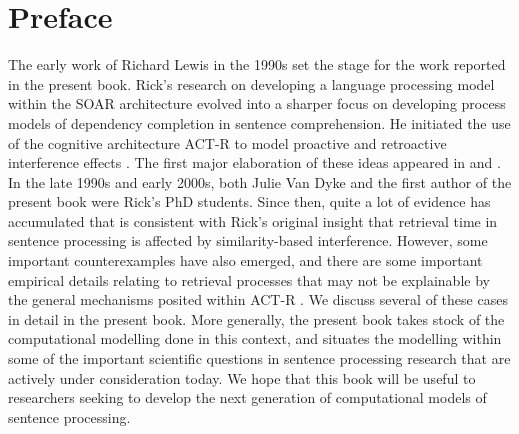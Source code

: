 
\chapter*{Preface}


The early work of Richard Lewis in the 1990s set the stage for the work reported in the present book. Rick's research \citep{lewis:phd} on developing a language processing model within the SOAR  architecture evolved into a sharper focus on developing process models of dependency completion in sentence comprehension. He initiated the use of the cognitive architecture ACT-R to model proactive and retroactive interference effects \citep{lewis:magical}.  The first major elaboration of these ideas appeared in \cite{LewisVasishth2005} and \cite{LewisVasishthVanDyke2006}. In the late 1990s and early 2000s, both Julie Van Dyke and the first author of the present book were Rick's PhD students. Since then, quite a lot of evidence has accumulated that is consistent with Rick's original insight  that retrieval time in sentence processing is affected by similarity-based interference. However, some important counterexamples have also emerged, and there are some important empirical details relating to retrieval processes that may not be explainable by the general mechanisms posited within ACT-R \citep{AndersonEtAl2004}. We discuss several of these cases in detail in the present book. More generally, the present book takes stock of the computational modelling done in this context, and situates the modelling within some of the important scientific questions in sentence processing research that are actively under consideration today. We hope that this book will be useful to researchers seeking to develop the next generation of computational models of sentence processing.
 
